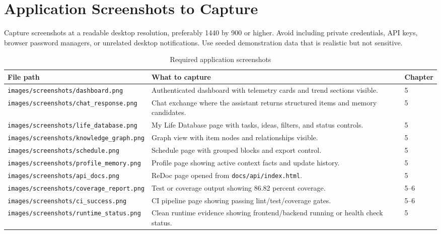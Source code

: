 \section{Application Screenshots to Capture}

Capture screenshots at a readable desktop resolution, preferably 1440 by 900 or higher. Avoid including private credentials, API keys, browser password managers, or unrelated desktop notifications. Use seeded demonstration data that is realistic but not sensitive.

\begin{longtable}{|p{}|p{}|p{}|}
\caption{Required application screenshots}
\label{tab:screenshot-checklist}\\
\hline
\textbf{File path} & \textbf{What to capture} & \textbf{Chapter}\\
\hline
\texttt{images/screenshots/dashboard.png} & Authenticated dashboard with telemetry cards and trend sections visible. & 5\\
\hline
\texttt{images/screenshots/chat\_response.png} & Chat exchange where the assistant returns structured items and memory candidates. & 5\\
\hline
\texttt{images/screenshots/life\_database.png} & My Life Database page with tasks, ideas, filters, and status controls. & 5\\
\hline
\texttt{images/screenshots/knowledge\_graph.png} & Graph view with item nodes and relationships visible. & 5\\
\hline
\texttt{images/screenshots/schedule.png} & Schedule page with grouped blocks and export control. & 5\\
\hline
\texttt{images/screenshots/profile\_memory.png} & Profile page showing active context facts and update history. & 5\\
\hline
\texttt{images/screenshots/api\_docs.png} & ReDoc page opened from \texttt{docs/api/index.html}. & 5\\
\hline
\texttt{images/screenshots/coverage\_report.png} & Test or coverage output showing 86.82 percent coverage. & 5--6\\
\hline
\texttt{images/screenshots/ci\_success.png} & CI pipeline page showing passing lint/test/coverage gates. & 5--6\\
\hline
\texttt{images/screenshots/runtime\_status.png} & Clean runtime evidence showing frontend/backend running or health check status. & 5\\
\hline
\end{longtable}

